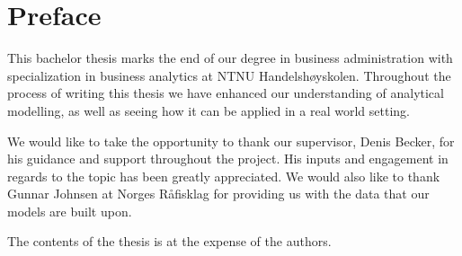 \section*{Preface}

This bachelor thesis marks the end of our degree in business administration with specialization in business analytics at NTNU Handelshøyskolen. Throughout the process of writing this thesis we have enhanced our understanding of analytical modelling, as well as seeing how it can be applied in a real world setting. 

We would like to take the opportunity to thank our supervisor, Denis Becker, for his guidance and support throughout the project. His inputs and engagement in regards to the topic has been greatly appreciated. We would also like to thank Gunnar Johnsen at Norges Råfisklag for providing us with the data that our models are built upon.    

The contents of the thesis is at the expense of the authors. 


\begin{Form}
\end{Form}